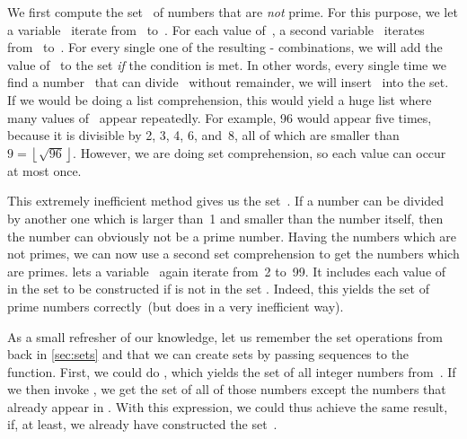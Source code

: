 We first compute the set~ of numbers that are \emph{not} prime.
For this purpose, we let a variable~ iterate from~ to~.
For each value of~, a second variable~ iterates from~ to~.
For every single one of the resulting \nobreakdashes- combinations, we will add the value of~ to the set \emph{if} the condition  is met.
In other words, every single time we find a number~ that can divide~ without remainder, we will insert~ into the set.
If we would be doing a list comprehension, this would yield a huge list where many values of~ appear repeatedly.
For example, 96 would appear five times, because it is divisible by 2, 3, 4, 6, and~8, all of which are smaller than~$9=\left\lfloor\sqrt{96}\right\rfloor$.
However, we are doing set comprehension, so each value can occur at most once.%
%
\begin{sloppypar}%
This extremely inefficient method gives us the set~.
If a number can be divided by another one which is larger than~1 and smaller than the number itself, then the number can obviously not be a prime number.
Having the numbers which are not primes, we can now use a second set comprehension to get the numbers which are primes.
 lets a variable~ again iterate from~2 to~99.
It includes each value of~ in the set to be constructed if  is not in the set .
Indeed, this yields the set of prime numbers correctly~(but does in a very inefficient way).%
\end{sloppypar}%
%
\begin{sloppypar}%
As a small refresher of our knowledge, let us remember the set operations from back in \cref{sec:sets} and that we can create sets by passing sequences to the  function.
First, we could do , which yields the set of all integer numbers from~.
If we then invoke , we get the set of all of those numbers except the numbers that already appear in .
With this expression, we could thus achieve the same result, if, at least, we already have constructed the set~.%
\end{sloppypar}%
